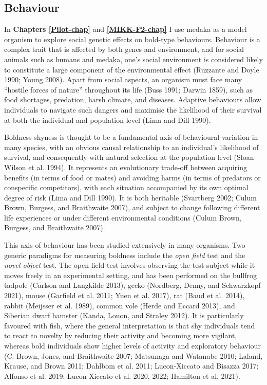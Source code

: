 \documentclass[
]{book}
\begin{document}
\hypertarget{behaviour}{%
\subsection{Behaviour}\label{behaviour}}

In \textbf{Chapters \ref{Pilot-chap}} and \textbf{\ref{MIKK-F2-chap}} I use medaka as a model organism to explore social genetic effects on bold-type behaviours. Behaviour is a complex trait that is affected by both genes and environment, and for social animals such as humans and medaka, one's social environment is considered likely to constitute a large component of the environmental effect (Ruzzante and Doyle 1990; Young 2008). Apart from social aspects, an organism must face many ``hostile forces of nature'' throughout its life (Buss 1991; Darwin 1859), such as food shortages, predation, harsh climate, and diseases. Adaptive behaviours allow individuals to navigate such dangers and maximise the likelihood of their survival at both the individual and population level (Lima and Dill 1990).

Boldness-shyness is thought to be a fundamental axis of behavioural variation in many species, with an obvious causal relationship to an individual's likelihood of survival, and consequently with natural selection at the population level (Sloan Wilson et al. 1994). It represents an evolutionary trade-off between acquiring benefits (in terms of food or mates) and avoiding harms (in terms of predators or conspecific competitors), with each situation accompanied by its own optimal degree of risk (Lima and Dill 1990). It is both heritable (Svartberg 2002; Culum Brown, Burgess, and Braithwaite 2007), and subject to change following different life experiences or under different environmental conditions (Culum Brown, Burgess, and Braithwaite 2007).

This axis of behaviour has been studied extensively in many organisms. Two generic paradigms for measuring boldness include the \emph{open field} test and the \emph{novel object} test. The open field test involves observing the test subject while it moves freely in an experimental setting, and has been performed on the bullfrog tadpole (Carlson and Langkilde 2013), gecko (Nordberg, Denny, and Schwarzkopf 2021), mouse (Garfield et al. 2011; Yuen et al. 2017), rat (Baud et al. 2014), rabbit (Meijsser et al. 1989), common vole (Herde and Eccard 2013), and Siberian dwarf hamster (Kanda, Louon, and Straley 2012). It is particularly favoured with fish, where the general interpretation is that shy individuals tend to react to novelty by reducing their activity and becoming more vigilant, whereas bold individuals show higher levels of activity and exploratory behaviour (C. Brown, Jones, and Braithwaite 2007; Matsunaga and Watanabe 2010; Laland, Krause, and Brown 2011; Dahlbom et al. 2011; Lucon-Xiccato and Bisazza 2017; Alfonso et al. 2019; Lucon-Xiccato et al. 2020, 2022; Hamilton et al. 2021).
\end{document}
